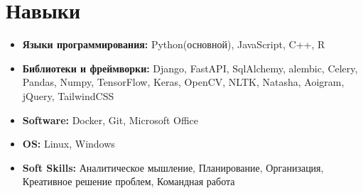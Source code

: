 \section{Навыки}
{\begin{itemize}[label=\textbullet]
\item {\textbf{Языки программирования:} Python(основной), JavaScript, C++, R}
\item {\textbf{Библиотеки и фреймворки:} Django, FastAPI, SqlAlchemy, alembic, Celery, Pandas, Numpy, TensorFlow, Keras, OpenCV, NLTK, Natasha, Aoigram, jQuery, TailwindCSS}
\item {\textbf{Software:} Docker, Git, Microsoft Office}
\item {\textbf{OS:} Linux, Windows}
\item {\textbf{Soft Skills:} Аналитическое мышление, Планирование, Организация, Креативное решение проблем, Командная работа}
\end{itemize}}
